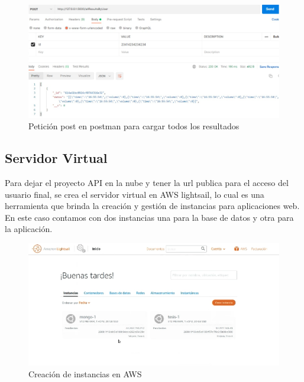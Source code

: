 \documentclass[12pt]{article}
\begin{document}
\begin{enumerate}
            
            \begin{figure}[ht]
            \centering
            \includegraphics[scale=0.4]{imag/resultsbyuser.png}
            \caption{Petición post en postman para cargar todos los resultados }
            \label{6}
            \end{figure}
            \FloatBarrier
    
    
\end{enumerate}





\subsection{Servidor Virtual}

Para dejar el proyecto API en la nube y tener la url publica para el acceso del usuario final, se crea el servidor virtual en AWS lightsail, lo cual es una herramienta que brinda la creación y gestión de instancias para aplicaciones web. En este caso contamos con dos instancias una para la base de datos y otra para la aplicación.

\begin{figure}[ht]
\centering
\includegraphics[scale=0.4]{imag/maquinasAWS.png}
\caption{Creación de instancias en AWS }
\label{6}
\end{figure}
\FloatBarrier
\end{document}
